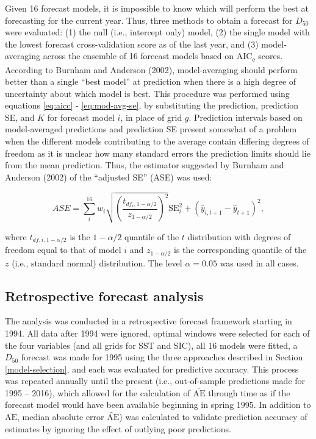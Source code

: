 \documentclass[12pt,]{book}
\theoremstyle{definition}
\theoremstyle{definition}
\theoremstyle{definition}
\theoremstyle{remark}
\begin{document}
Given 16 forecast models, it is impossible to know which will perform
the best at forecasting for the current year. Thus, three methods to
obtain a forecast for \(D_{50}\) were evaluated: (1) the null (i.e.,
intercept only) model, (2) the single model with the lowest forecast
cross-validation score as of the last year, and (3) model-averaging
across the ensemble of 16 forecast models based on AIC\textsubscript{c}
scores. According to Burnham and Anderson (2002), model-averaging should
perform better than a single ``best model'' at prediction when there is
a high degree of uncertainty about which model is best. This procedure
was performed using equations \eqref{eq:aicc} - \eqref{eq:mod-avg-se}, by
substituting the prediction, prediction SE, and \(K\) for forecast model
\(i\), in place of grid \(g\). Prediction intervals based on
model-averaged predictions and prediction SE present somewhat of a
problem when the different models contributing to the average contain
differing degrees of freedom as it is unclear how many standard errors
the prediction limits should lie from the mean prediction. Thus, the
estimator suggested by Burnham and Anderson (2002) of the ``adjusted
SE'' (ASE) was used:

\begin{equation}
  ASE=\sum_i^{16} w_i \sqrt{\left(\frac{t_{df_i,1-\alpha/2}}{z_{1-\alpha/2}}\right)^2} \text{SE}_i^2+(\hat{y}_{i,t+1}-\hat{y}_{t+1})^2,
\label{eq:ase}
\end{equation}

where \(t_{df,i,1-\alpha/2}\) is the \(1-\alpha/2\) quantile of the
\(t\) distribution with degrees of freedom equal to that of model \(i\)
and \(z_{1-\alpha/2}\) is the corresponding quantile of the \(z\) (i.e.,
standard normal) distribution. The level \(\alpha = 0.05\) was used in
all cases.

\subsection{Retrospective forecast
analysis}\label{retrospective-forecast-analysis}

The analysis was conducted in a retrospective forecast framework
starting in 1994. All data after 1994 were ignored, optimal windows were
selected for each of the four variables (and all grids for SST and SIC),
all 16 models were fitted, a \(D_{50}\) forecast was made for 1995 using
the three approaches described in Section \ref{model-selection}, and
each was evaluated for predictive accuracy. This process was repeated
annually until the present (i.e., out-of-sample predictions made for
1995 -- 2016), which allowed for the calculation of
\(\overline{\text{AE}}\) through time as if the forecast model would
have been available beginning in spring 1995. In addition to
\(\overline{\text{AE}}\), median absolute error
\(\widetilde{\text{AE}}\)) was calculated to validate prediction
accuracy of estimates by ignoring the effect of outlying poor
predictions.
\end{document}
